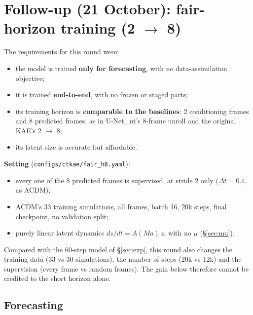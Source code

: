 \section{Follow-up (21 October): fair-horizon training (2 $\to$ 8)}\label{sec:fairh8}

The requirements for this round were:
\begin{itemize}
\item the model is trained \textbf{only for forecasting}, with no data-assimilation objective;
\item it is trained \textbf{end-to-end}, with no frozen or staged parts;
\item its training horizon is \textbf{comparable to the baselines}: 2 conditioning frames and 8
  predicted frames, as in U-Net\_ut's 8-frame unroll and the original KAE's 2 $\to$ 8;
\item its latent size is accurate but affordable.
\end{itemize}

\textbf{Setting} (\texttt{configs/ctkae/fair\_h8.yaml}):
\begin{itemize}
\item every one of the 8 predicted frames is supervised, at stride 2 only ($\Delta t = 0.1$, as
  ACDM);
\item ACDM's 33 training simulations, all frames, batch 16, 20k steps, final checkpoint, no
  validation split;
\item purely linear latent dynamics $dz/dt = A(Ma)\,z$, with no $\mu$ (\S\ref{sec:mu}).
\end{itemize}
Compared with the 60-step model of \S\ref{sec:exp}, this round also changes the training data
(33 vs 30 simulations), the number of steps (20k vs 12k) and the supervision (every frame vs
random frames). The gain below therefore cannot be credited to the short horizon alone.

\subsection{Forecasting}

